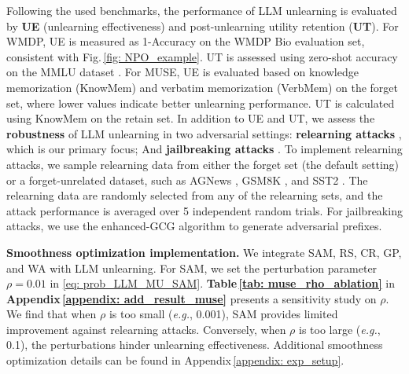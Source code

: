 Following the used benchmarks, the performance of LLM unlearning is evaluated by \textbf{UE} (unlearning effectiveness) and post-unlearning utility retention (\textbf{UT}). For WMDP, UE is measured as 1-Accuracy on the WMDP Bio evaluation set, consistent with Fig.\,\ref{fig: NPO_example}. UT is assessed using zero-shot accuracy on the MMLU dataset \citep{hendrycks2020measuring}.
For MUSE, UE is evaluated based on knowledge memorization ({KnowMem}) and  verbatim memorization ({VerbMem}) on the forget set,  where lower values indicate better unlearning performance. {UT is calculated using KnowMem on the retain set.}
In addition to UE and UT, we assess the \textbf{robustness} of LLM unlearning in two adversarial settings: \textbf{relearning attacks} \citep{hu2024jogging}, which is our primary focus; And \textbf{jailbreaking attacks} \citep{lucki2024adversarial, thompson2024flrt}.
To implement relearning attacks, we sample relearning data from either the forget set (the default setting) or a forget-unrelated dataset, such as AGNews \citep{zhang2015character}, GSM8K \citep{cobbe2021gsm8k}, and SST2 \citep{socher2013recursive}. The relearning data are randomly selected from any of the relearning sets, and the attack performance is averaged over 5 independent random trials.
For jailbreaking attacks, we use the enhanced-GCG algorithm \citep{lucki2024adversarial,zou2023universal,thompson2024flrt} to generate adversarial prefixes.

\noindent \textbf{Smoothness optimization implementation.} 
We integrate SAM, RS, CR, GP, and WA with LLM unlearning. For SAM, we set the perturbation parameter $\rho = 0.01$ in \eqref{eq: prob_LLM_MU_SAM}. \textbf{Table\,\ref{tab: muse_rho_ablation}} in \textbf{Appendix\,\ref{appendix: add_result_muse}} presents a sensitivity study on $\rho$. We find that when $\rho$ is too small (\textit{e.g.}, 0.001), SAM provides limited improvement against relearning attacks. Conversely, when $\rho$ is too large (\textit{e.g.}, 0.1), the perturbations hinder unlearning effectiveness. Additional smoothness optimization details can be found in Appendix\,\ref{appendix: exp_setup}.



